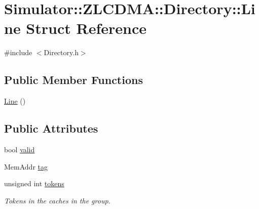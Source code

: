 \hypertarget{struct_simulator_1_1_z_l_c_d_m_a_1_1_directory_1_1_line}{\section{Simulator\+:\+:Z\+L\+C\+D\+M\+A\+:\+:Directory\+:\+:Line Struct Reference}
\label{struct_simulator_1_1_z_l_c_d_m_a_1_1_directory_1_1_line}
}


{\ttfamily \#include $<$Directory.\+h$>$}

\subsection*{Public Member Functions}
\begin{DoxyCompactItemize}
\item 
\hyperlink{struct_simulator_1_1_z_l_c_d_m_a_1_1_directory_1_1_line_a1a36f558775a2d27f888e33fc58dc5de}{Line} ()
\end{DoxyCompactItemize}
\subsection*{Public Attributes}
\begin{DoxyCompactItemize}
\item 
bool \hyperlink{struct_simulator_1_1_z_l_c_d_m_a_1_1_directory_1_1_line_ab24710121e177d545ae12822af6967bd}{valid}
\item 
Mem\+Addr \hyperlink{struct_simulator_1_1_z_l_c_d_m_a_1_1_directory_1_1_line_a01b66f92df23ab599a5713f18112cde8}{tag}
\item 
unsigned int \hyperlink{struct_simulator_1_1_z_l_c_d_m_a_1_1_directory_1_1_line_a5219492d0b31d3a4833e4570aa64ffed}{tokens}
\begin{DoxyCompactList}\small\item\em Tokens in the caches in the group. \end{DoxyCompactList}\end{DoxyCompactItemize}


